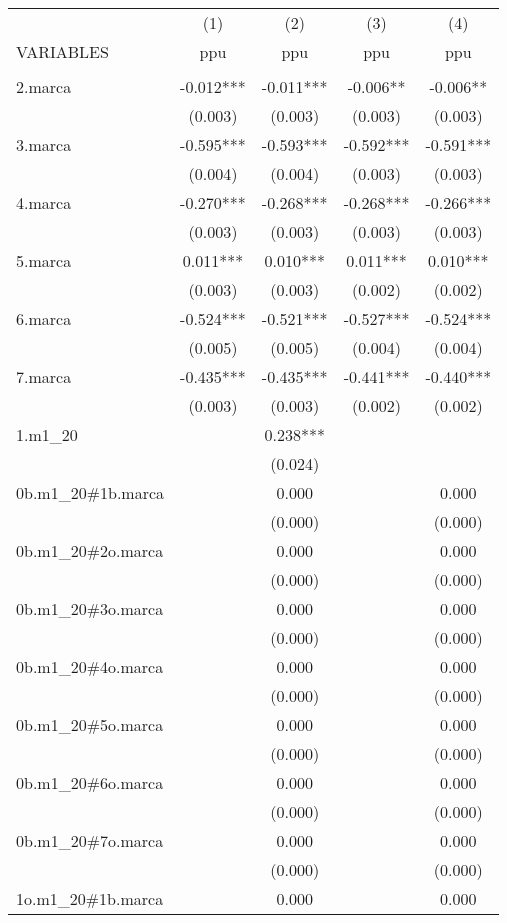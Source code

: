 \begin{tabular}{lcccc} \hline
 & (1) & (2) & (3) & (4) \\
VARIABLES & ppu & ppu & ppu & ppu \\ \hline
 &  &  &  &  \\
2.marca & -0.012*** & -0.011*** & -0.006** & -0.006** \\
 & (0.003) & (0.003) & (0.003) & (0.003) \\
3.marca & -0.595*** & -0.593*** & -0.592*** & -0.591*** \\
 & (0.004) & (0.004) & (0.003) & (0.003) \\
4.marca & -0.270*** & -0.268*** & -0.268*** & -0.266*** \\
 & (0.003) & (0.003) & (0.003) & (0.003) \\
5.marca & 0.011*** & 0.010*** & 0.011*** & 0.010*** \\
 & (0.003) & (0.003) & (0.002) & (0.002) \\
6.marca & -0.524*** & -0.521*** & -0.527*** & -0.524*** \\
 & (0.005) & (0.005) & (0.004) & (0.004) \\
7.marca & -0.435*** & -0.435*** & -0.441*** & -0.440*** \\
 & (0.003) & (0.003) & (0.002) & (0.002) \\
1.m1\_20 &  & 0.238*** &  &  \\
 &  & (0.024) &  &  \\
0b.m1\_20\#1b.marca &  & 0.000 &  & 0.000 \\
 &  & (0.000) &  & (0.000) \\
0b.m1\_20\#2o.marca &  & 0.000 &  & 0.000 \\
 &  & (0.000) &  & (0.000) \\
0b.m1\_20\#3o.marca &  & 0.000 &  & 0.000 \\
 &  & (0.000) &  & (0.000) \\
0b.m1\_20\#4o.marca &  & 0.000 &  & 0.000 \\
 &  & (0.000) &  & (0.000) \\
0b.m1\_20\#5o.marca &  & 0.000 &  & 0.000 \\
 &  & (0.000) &  & (0.000) \\
0b.m1\_20\#6o.marca &  & 0.000 &  & 0.000 \\
 &  & (0.000) &  & (0.000) \\
0b.m1\_20\#7o.marca &  & 0.000 &  & 0.000 \\
 &  & (0.000) &  & (0.000) \\
1o.m1\_20\#1b.marca &  & 0.000 &  & 0.000 \\

\end{tabular}
